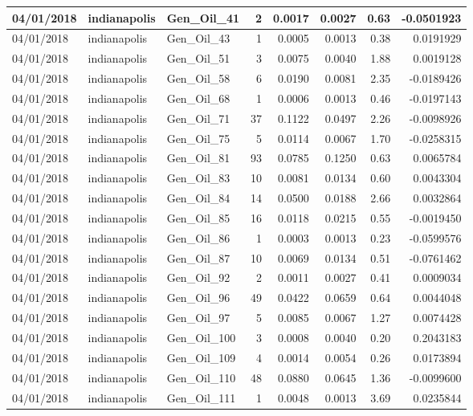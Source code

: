 \documentclass[
  letterpaper,
  DIV=11,
  numbers=noendperiod]{scrartcl}
\begin{document}
\begin{tabular}{l|l|l|r|r|r|r|r}
\hline
04/01/2018 & indianapolis & Gen\_Oil\_41 & 2 & 0.0017 & 0.0027 & 0.63 & -0.0501923\\
\hline
04/01/2018 & indianapolis & Gen\_Oil\_43 & 1 & 0.0005 & 0.0013 & 0.38 & 0.0191929\\
\hline
04/01/2018 & indianapolis & Gen\_Oil\_51 & 3 & 0.0075 & 0.0040 & 1.88 & 0.0019128\\
\hline
04/01/2018 & indianapolis & Gen\_Oil\_58 & 6 & 0.0190 & 0.0081 & 2.35 & -0.0189426\\
\hline
04/01/2018 & indianapolis & Gen\_Oil\_68 & 1 & 0.0006 & 0.0013 & 0.46 & -0.0197143\\
\hline
04/01/2018 & indianapolis & Gen\_Oil\_71 & 37 & 0.1122 & 0.0497 & 2.26 & -0.0098926\\
\hline
04/01/2018 & indianapolis & Gen\_Oil\_75 & 5 & 0.0114 & 0.0067 & 1.70 & -0.0258315\\
\hline
04/01/2018 & indianapolis & Gen\_Oil\_81 & 93 & 0.0785 & 0.1250 & 0.63 & 0.0065784\\
\hline
04/01/2018 & indianapolis & Gen\_Oil\_83 & 10 & 0.0081 & 0.0134 & 0.60 & 0.0043304\\
\hline
04/01/2018 & indianapolis & Gen\_Oil\_84 & 14 & 0.0500 & 0.0188 & 2.66 & 0.0032864\\
\hline
04/01/2018 & indianapolis & Gen\_Oil\_85 & 16 & 0.0118 & 0.0215 & 0.55 & -0.0019450\\
\hline
04/01/2018 & indianapolis & Gen\_Oil\_86 & 1 & 0.0003 & 0.0013 & 0.23 & -0.0599576\\
\hline
04/01/2018 & indianapolis & Gen\_Oil\_87 & 10 & 0.0069 & 0.0134 & 0.51 & -0.0761462\\
\hline
04/01/2018 & indianapolis & Gen\_Oil\_92 & 2 & 0.0011 & 0.0027 & 0.41 & 0.0009034\\
\hline
04/01/2018 & indianapolis & Gen\_Oil\_96 & 49 & 0.0422 & 0.0659 & 0.64 & 0.0044048\\
\hline
04/01/2018 & indianapolis & Gen\_Oil\_97 & 5 & 0.0085 & 0.0067 & 1.27 & 0.0074428\\
\hline
04/01/2018 & indianapolis & Gen\_Oil\_100 & 3 & 0.0008 & 0.0040 & 0.20 & 0.2043183\\
\hline
04/01/2018 & indianapolis & Gen\_Oil\_109 & 4 & 0.0014 & 0.0054 & 0.26 & 0.0173894\\
\hline
04/01/2018 & indianapolis & Gen\_Oil\_110 & 48 & 0.0880 & 0.0645 & 1.36 & -0.0099600\\
\hline
04/01/2018 & indianapolis & Gen\_Oil\_111 & 1 & 0.0048 & 0.0013 & 3.69 & 0.0235844\\

\end{tabular}
\end{document}
